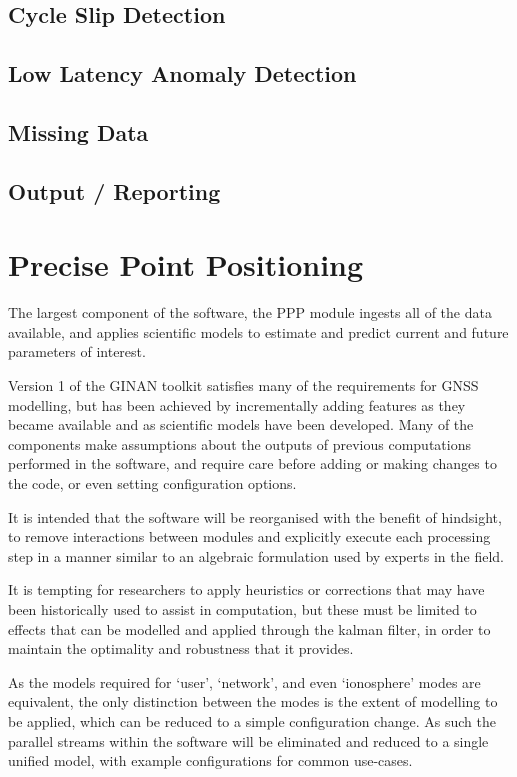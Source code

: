 \subsection{Cycle Slip Detection}
\subsection{Low Latency Anomaly Detection}
\subsection{Missing Data}
\subsection{Output / Reporting}

\section{Precise Point Positioning}

The largest component of the software, the PPP module ingests all of the data available, and applies scientific models to estimate and predict current and future parameters of interest.

Version 1 of the GINAN toolkit satisfies many of the requirements for GNSS modelling, but has been achieved by incrementally adding features as they became available and as scientific models have been developed. Many of the components make assumptions about the outputs of previous computations performed in the software, and require care before adding or making changes to the code, or even setting configuration options.

It is intended that the software will be reorganised with the benefit of hindsight, to remove interactions between modules and explicitly execute each processing step in a manner similar to an algebraic formulation used by experts in the field.

It is tempting for researchers to apply heuristics or corrections that may have been historically used to assist in computation, but these must be limited to effects that can be modelled and applied through the kalman filter, in order to maintain the optimality and robustness that it provides.

As the models required for ‘user’, ‘network’, and even ‘ionosphere’ modes are equivalent, the only distinction between the modes is the extent of modelling to be applied, which can be reduced to a simple configuration change. As such the parallel streams within the software will be eliminated and reduced to a single unified model, with example configurations for common use-cases.

